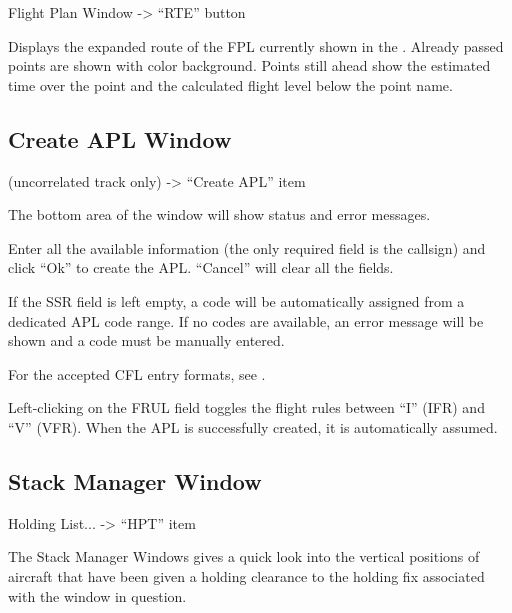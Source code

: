 \documentclass[a4paper,oneside,11pt]{memoir}
\begin{document}
Flight Plan Window -> “RTE” button

\bigskip


Displays the expanded route of the FPL currently shown in the . Already passed points are shown with  color background. Points still ahead show the estimated time over the point and the calculated flight level below the point name.

\subsection{Create APL Window}
\label{win:apl}

 (uncorrelated track only) -> “Create APL” item


\bigskip

The bottom area of the window will show status and error messages.

\bigskip

Enter all the available information (the only required field is the callsign) and click “Ok” to create the APL. “Cancel” will clear all the fields.

\bigskip

If the SSR field is left empty, a code will be automatically assigned from a dedicated APL code range. If no codes are available, an error message will be shown and a code must be manually entered.

\bigskip

For the accepted CFL entry formats, see .

\bigskip

Left-clicking on the FRUL field toggles the flight rules between “I” (IFR) and “V” (VFR).
When the APL is successfully created, it is automatically assumed.

\subsection{Stack Manager Window}
\label{win:smw}
Holding List... -> “HPT” item

\bigskip


The Stack Manager Windows gives a quick look into the vertical positions of aircraft that have been given a holding clearance to the holding fix associated with the window in question.
\end{document}
